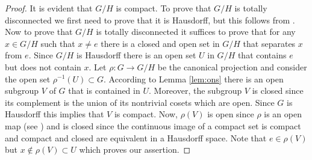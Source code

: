 \documentclass[12pt]{article}
\theoremstyle{definition}
\theoremstyle{remark}
\begin{document}
    \begin{proof}
        It is evident that $G/H$ is compact. To prove that $G/H$ is totally disconnected we first need to prove that it is Hausdorff, but this follows from \cite[Proposition 1-3 and Proposition 1-4(iii)]{FANF1999}. Now to prove that $G/H$ is totally disconnected it suffices to prove that for any $x\in G/H$ such that $x\neq e$ there is a closed and open set in $G/H$ that separates $x$ from $e$. Since $G/H$ is Hausdorff there is an open set $U$ in $G/H$ that contains $e$ but does not contain $x$. Let $\rho\colon G\to G/H$ be the canonical projection and consider the open set $\rho^{-1}(U)\subset G$. According to Lemma \ref{lem:ons} there is an open subgroup $V$ of $G$ that is contained in $U$. Moreover, the subgroup $V$ is closed since its complement is the union of its nontrivial cosets which are open. Since $G$ is Hausdorff this implies that $V$ is compact. Now, $\rho(V)$ is open since $\rho$ is an open map (see \cite[Proposition 1-4(ii)]{FANF1999}) and is closed since the continuous image of a compact set is compact and compact and closed are equivalent in a Hausdorff space. Note that $e\in\rho(V)$ but $x\not\in\rho(V)\subset U$ which proves our assertion.
    \end{proof}

    \printbibliography
\end{document}
